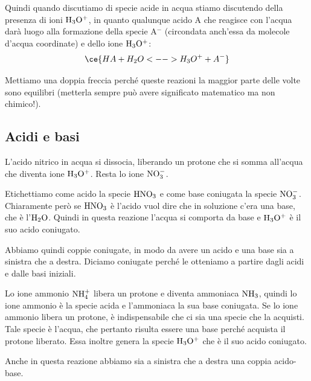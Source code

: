 \vspace{0.2cm}Quindi quando discutiamo di specie acide in acqua stiamo discutendo della presenza di ioni $\rm H_3O^+$, in quanto qualunque acido A che reagisce con l'acqua darà luogo alla formazione della specie A$^-$ (circondata anch'essa da molecole d'acqua coordinate) e dello ione $\rm H_3O^+$:
$$\ce{HA + H_2O <--> H_3O^+ + A^-}$$

Mettiamo una doppia freccia perché queste reazioni la maggior parte delle volte sono equilibri (metterla sempre può avere significato matematico ma non chimico!).
\subsection{Acidi e basi}

\vspace{0.2cm}

\vspace{0.2cm}L'acido nitrico in acqua si dissocia, liberando un protone che si somma all'acqua che diventa ione $\rm H_3O^+$. Resta lo ione $\rm NO_3^-$.

Etichettiamo come acido la specie $\rm HNO_3$ e come base coniugata la specie $\rm NO_3^-$. Chiaramente però se $\rm HNO_3$ è l'acido vuol dire che in soluzione c'era una base, che è l'$\rm H_2O$. Quindi in questa reazione l'acqua si comporta da base e $\rm H_3O^+$ è il suo acido coniugato.

Abbiamo quindi coppie coniugate, in modo da avere un acido e una base sia a sinistra che a destra. Diciamo coniugate perché le otteniamo a partire dagli acidi e dalle basi iniziali.

\vspace{0.2cm}

\vspace{0.2cm}Lo ione ammonio $\rm NH_4^+$ libera un protone e diventa ammoniaca $\rm NH_3$, quindi lo ione ammonio è la specie acida e l'ammoniaca la sua base coniugata. Se lo ione ammonio libera un protone, è indispensabile che ci sia una specie che la acquisti. Tale specie è l'acqua, che pertanto risulta essere una base perché acquista il protone liberato. Essa inoltre genera la specie $\rm H_3O^+$ che è il suo acido coniugato.

Anche in questa reazione abbiamo sia a sinistra che a destra una coppia acido-base.

\vspace{0.2cm}

